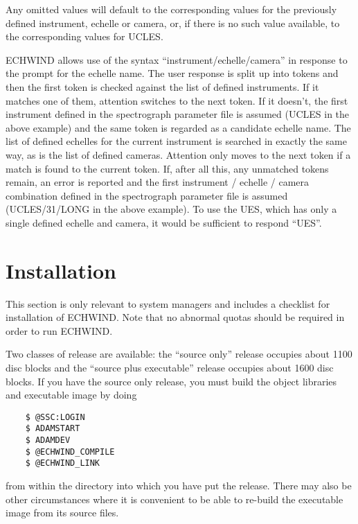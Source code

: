 Any omitted values will default to the corresponding values for the previously
defined instrument, echelle or camera, or, if there is no such value available,
to the corresponding values for UCLES.

ECHWIND allows use of the syntax ``instrument/echelle/camera'' in response to
the prompt for the echelle name. The user response is split up into tokens and
then the first token is checked against the list of defined instruments. If it
matches one of them, attention switches to the next token. If it doesn't, the
first instrument defined in the spectrograph parameter file is assumed (UCLES
in the above example) and the same token is regarded as a candidate echelle
name. The list of defined echelles for the current instrument is searched in
exactly the same way, as is the list of defined cameras. Attention only moves
to the next token if a match is found to the current token. If, after all this,
any unmatched tokens remain, an error is reported and the first instrument / 
echelle / camera combination defined in the spectrograph parameter file is
assumed (UCLES/31/LONG in the above example). To use the UES, which has only a
single defined echelle and camera, it would be sufficient to respond ``UES''.

\section{Installation}

This section is only relevant to system managers and includes a checklist for
installation of ECHWIND. Note that no abnormal quotas should be required in
order to run ECHWIND.

Two classes of release are available: the ``source only'' release occupies
about 1100 disc blocks and the ``source plus executable'' release occupies
about 1600 disc blocks. If you have the source only release, you must build the
object libraries and executable image by doing
\begin{verbatim}
    $ @SSC:LOGIN
    $ ADAMSTART
    $ ADAMDEV
    $ @ECHWIND_COMPILE
    $ @ECHWIND_LINK
\end{verbatim}
from within the directory into which you have put the release. There may also
be other circumstances where it is convenient to be able to re-build the
executable image from its source files.


